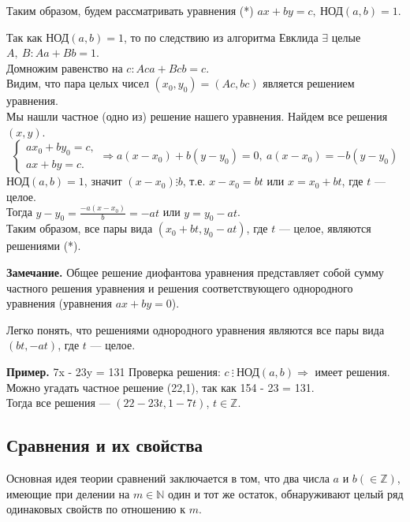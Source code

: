 \documentclass{article}
\begin{document}
            Таким образом, будем рассматривать уравнения (*) \( ax + by = c,\ \textrm{НОД}(a,b) = 1 \).

            Так как \( \textrm{НОД}(a, b) = 1 \), то по следствию из алгоритма Евклида \( \exists \) целые \( A,\ B: Aa + Bb = 1 \).\\
            Домножим равенство на \( c: Aca + Bcb = c \).\\
            Видим, что пара целых чисел \( (x_0,y_0) = (Ac, bc) \) является решением уравнения.\\
            Мы нашли частное (одно из) решение нашего уравнения. Найдем все решения \( (x,y) \).\\

            \[ \begin{cases}
                ax_0 + by_0 = c,\\
                ax + by = c.
            \end{cases} \Rightarrow a(x - x_0) + b(y - y_0) = 0,\ a(x - x_0) = -b(y - y_0) \]
            \( \textrm{НОД}(a,b) = 1 \), значит \( (x - x_0) \vdots b \), т.е. \( x - x_0 = bt \) или \( x = x_0 + bt \), где \( t \) --- целое.\\
            Тогда \( y - y_0 = \frac{-a(x - x_0)}{b} = -at \) или \( y = y_0 - at \).\\
            Таким образом, все пары вида \( (x_0 + bt, y_0 - at) \), где \( t \) --- целое, являются решениями (*).

            \textbf{Замечание.} Общее решение диофантова уравнения представляет собой сумму частного решения уравнения и решения соответствующего однородного уравнения (уравнения \( ax + by = 0 \)).

            Легко понять, что решениями однородного уравнения являются все пары вида \( (bt, -at) \), где \( t \) --- целое.

            \textbf{Пример.} 7x - 23y = 131
            Проверка решения: \( c\ \vdots \ \textrm{НОД}(a,b) \Rightarrow \) имеет решения.\\ 
            Можно угадать частное решение (22,1), так как 154 - 23 = 131.\\
            Тогда все решения --- \( (22-23t,1-7t) \), \( t \in \mathbb{Z} \).

        \subsection{Сравнения и их свойства}
        	Основная идея теории сравнений заключается в том, что два числа \( a \) и \( b (\in \mathbb{Z}) \), имеющие при делении на \( m \in \mathbb{N} \) один и тот же остаток, обнаруживают целый ряд одинаковых свойств по отношению к \( m \).
\end{document}
